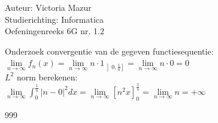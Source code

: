 \documentclass[a4paper]{article}
\begin{document}
  
\noindent \large Auteur: Victoria Mazur \\
\noindent \large Studierichting: Informatica\\
\noindent \large Oefeningenreeks 6G nr. 1.2\\

\medskip

\normalsize

Onderzoek convergentie van de gegeven functiesequentie: \\

$\lim\limits_{n \rightarrow \infty} f_n(x) = \lim\limits_{n \rightarrow \infty} n \cdot 1_{\left]0, \tfrac{1}{n}\right]} = \lim\limits_{n \rightarrow \infty} n \cdot 0 = 0$ \\

$L^2$ norm berekenen: \\

$\lim\limits_{n \rightarrow \infty} \displaystyle\int_0^{\tfrac{1}{n}} |n - 0|^2 dx = \lim\limits_{n \rightarrow \infty} \left[n^2 x\right]_0^{\tfrac{1}{n}} = \lim\limits_{n \rightarrow \infty} n = +\infty$ \\

\begin{thebibliography}{999}
\end{thebibliography}
\end{document}
